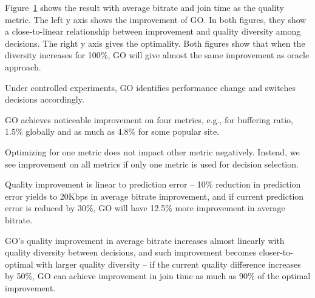 \begin{figure}[h!]
\centering
{}
\hspace{-0.6cm}
\label{fig:trace-diversity}
\end{figure}

Figure~\ref{fig:trace-diversity} shows the result with average bitrate and join time as the quality metric. The left y axis shows the improvement of GO. In both figures, they show a close-to-linear relationship between improvement and quality diversity among decisions. 
The right y axis gives the optimality. Both figures show that when the diversity increases for 100\%, GO will give almost the same improvement as oracle approach.



\begin{packedenumerate}
	\item Under controlled experiments, GO identifies performance change and switches decisions accordingly.
	\item GO achieves noticeable improvement on four metrics, e.g., for buffering ratio, 1.5\% globally and as much as 4.8\% for some popular site.
	\item Optimizing for one metric does not impact other metric negatively. Instead, we see improvement on all metrics if only one metric is used for decision selection.
	\item Quality improvement is linear to prediction error -- 10\% reduction in prediction error yields to 20Kbps in average bitrate improvement, and if current prediction error is reduced by 30\%, GO will have 12.5\% more improvement in average bitrate.
	\item GO's quality improvement in average bitrate increases almost linearly with quality diversity between decisions, and such improvement becomes closer-to-optimal with larger quality diversity -- if the current quality difference increases by 50\%, GO can achieve improvement in join time as much as 90\% of the optimal improvement.
\end{packedenumerate}


